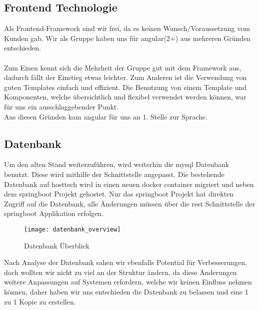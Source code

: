 \documentclass[../main.tex]{subfiles}
\begin{document}
	\subsection{Frontend Technologie}
	Als Frontend-Framework sind wir frei, da es keinen Wunsch/Voraussetzung vom Kunden gab.
	Wir als Gruppe haben uns für \gls{angular}(2+) aus mehreren Gründen entschieden. \\
	\\
	Zum Einen kennt sich die Mehrheit der Gruppe gut mit dem Framework aus, dadurch fällt der Einstieg etwas leichter. Zum Anderen ist die Verwendung von guten Templates einfach und effizient. Die Benutzung von einem Template und Komponenten, welche übersichtlich und flexibel verwendet werden können, war für uns ein ausschlaggebender Punkt. \\ 
	Aus diesen Gründen kam \gls{angular} für uns an 1. Stelle zur Sprache.
	
	
	\subsection{Datenbank}
	Um den alten Stand weiterzuführen, wird weiterhin die \gls{mysql} Datenbank benutzt. Diese wird mithilfe der Schnittstelle angepasst.
	Die bestehende Datenbank auf \gls{hosttech} wird in einen neuen \gls{docker} \gls{container} migriert und neben dem \gls{springboot} Projekt gehostet. Nur das \gls{springboot} Projekt hat direkten Zugriff auf die Datenbank, alle Änderungen müssen über die \gls{rest} Schnittstelle der \gls{springboot} Applikation erfolgen.
	
	\begin{figure}[H]
		\centering
		\texttt{[image: datenbank\_overview]}
		\caption{Datenbank Überblick}
		\label{fig:datenbank_overview}
	\end{figure}
	\par
	\noindent
	Nach Analyse der Datenbank sahen wir ebenfalls Potential für Verbesserungen, doch wollten wir nicht zu viel an der Struktur ändern, da diese Änderungen weitere Anpassungen auf Systemen erfordern, welche wir keinen Einfluss nehmen können, daher haben wir uns entschieden die Datenbank zu belassen und eine 1 zu 1 Kopie zu erstellen.
\end{document}
